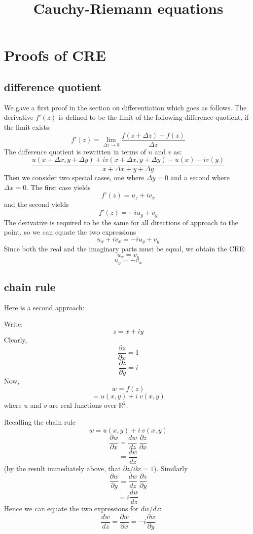 \documentclass[11pt, oneside]{article}   	%
\title{Cauchy-Riemann equations}
\date{}							%
\begin{document}
\maketitle
\Large
\section*{Proofs of CRE}
\subsection*{difference quotient}

We gave a first proof in the section on differentiation which goes as follows.  The derivative $f'(z)$ is defined to be the limit of the following difference quotient, if the limit exists.
\[ f'(z) = \lim_{\Delta z \rightarrow 0} \frac{f(z + \Delta z) - f(z)}{\Delta z} \]
The difference quotient is rewritten in terms of $u$ and $v$ as:
\[ \frac{u(x + \Delta x, y + \Delta y) + i v(x + \Delta x, y + \Delta y) - u(x) - i v(y)}{x + \Delta x + y + \Delta y} \]
Then we consider two special cases, one where $\Delta y = 0$ and a second where $\Delta x = 0$.  The first case yields
\[ f'(z) = u_z + i v_x \]
and the second yields
\[ f'(z) = -i u_y + v_y \]
The derivative is required to be the same for all directions of approach to the point, so we can equate the two expressions
\[ u_x + i v_x = -i u_y + v_y \]
Since both the real and the imaginary parts must be equal, we obtain the CRE:
\[ u_x = v_y \]
\[ u_y = - v_x \]

\subsection*{chain rule}
Here is a second approach:

Write:
\[ z = x + iy \]
Clearly,
\[ \frac{\partial z}{\partial x} = 1 \]
\[ \frac{\partial z}{\partial y} = i \]
Now,
\[ w = f(z) \]
\[ = u(x,y) + i \ v(x,y) \]
where $u$ and $v$ are real functions over $\mathbb{R}^2$.

Recalling the chain rule
\[ w = u(x,y) + i \ v(x,y) \]
\[ \frac{\partial w}{\partial x} = \frac{dw}{dz} \ \frac{\partial z}{\partial x} \]
\[ =  \frac{dw}{dz} \]
(by the result immediately above, that $\partial z/\partial x = 1$).
Similarly
\[ \frac{\partial w}{\partial y} = \frac{dw}{dz} \ \frac{\partial z}{\partial y} \]
\[ =  i \frac{dw}{dz} \]
Hence we can equate the two expressions for $dw/dz$:
\[ \frac{dw}{dz} = \frac{\partial w}{\partial x} = -i \frac{\partial w}{\partial y} \]
\end{document}
